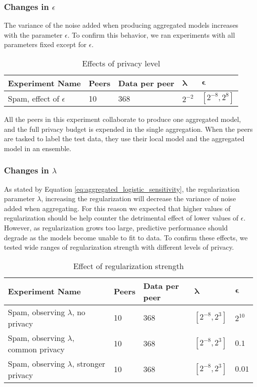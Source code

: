 \subsubsection{Changes in $\epsilon$}

The variance of the noise added when producing aggregated models increases with the parameter $\epsilon$. To confirm this behavior, we ran experiments with all parameters fixed except for $\epsilon$.

\begin{table}[h]
	\centering
	\caption{Effects of privacy level}
	\label{tab:experiments_privacy_level}
	\begin{tabular}{|l|l|l|l|l|}
		\textbf{Experiment Name}            & \textbf{Peers} & \textbf{Data per peer} &
		 $\boldsymbol{\lambda}$ & $\boldsymbol{\epsilon}$                                              \\
		 \hline
		Spam, effect of $\epsilon$ & 10    & 368  & $2^{-2}$  & $[2^{-8}, 2^{8}]$
	\end{tabular}
\end{table}

All the peers in this experiment collaborate to produce one aggregated model, and the full privacy budget is expended in the single aggregation. When the peers are tasked to label the test data, they use their local model and the aggregated model in an ensemble.

\subsubsection{Changes in $\lambda$}

As stated by Equation \ref{eq:aggregated_logistic_sensitivity}, the regularization parameter $\lambda$, increasing the regularization will decrease the variance of noise added when aggregating. For this reason we expected that higher values of regularization should be help counter the detrimental effect of lower values of $\epsilon$. However, as regularization grows too large, predictive performance should degrade as the models become unable to fit to data. To confirm these effects, we tested wide ranges of regularization strength with different levels of privacy.

\begin{table}[h]
	\centering
	\caption{Effect of regularization strength}
	\label{tab:experiments_regularization_strength}
	\begin{tabular}{|l|l|l|l|l|}
		\textbf{Experiment Name}    & \textbf{Peers} & \textbf{Data per peer} & $\boldsymbol{\lambda}$         & $\boldsymbol{\epsilon}$ \\
		\hline
		Spam, observing $\lambda$, no privacy       & 10    & 368  & $[2^{-8}, 2^{3}]$ & $2^{10}$   \\
		Spam, observing $\lambda$, common privacy   & 10    & 368  & $[2^{-8}, 2^{3}]$ & $0.1$      \\
		Spam, observing $\lambda$, stronger privacy & 10    & 368  & $[2^{-8}, 2^{3}]$ & $0.01$    
	\end{tabular}
\end{table}

